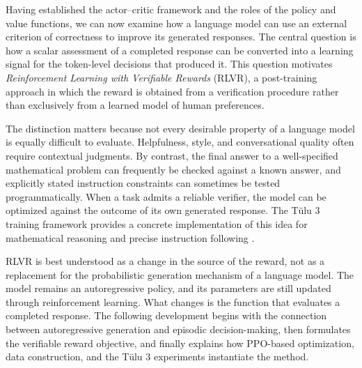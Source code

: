 %

Having established the actor--critic framework and the roles of the policy and
value functions, we can now examine how a language model can use an external
criterion of correctness to improve its generated responses. The central
question is how a scalar assessment of a completed response can be converted
into a learning signal for the token-level decisions that produced it. This
question motivates \emph{Reinforcement Learning with Verifiable Rewards}
(RLVR), a post-training approach in which the reward is obtained from a
verification procedure rather than exclusively from a learned model of human
preferences.

The distinction matters because not every desirable property of a language
model is equally difficult to evaluate. Helpfulness, style, and conversational
quality often require contextual judgments. By contrast, the final answer to a
well-specified mathematical problem can frequently be checked against a
known answer, and explicitly stated instruction constraints can sometimes be
tested programmatically. When a task admits a reliable verifier, the model can
be optimized against the outcome of its own generated response. The Tülu 3
training framework provides a concrete implementation of this idea for
mathematical reasoning and precise instruction following
\parencite{lambert2025tulu3}.

RLVR is best understood as a change in the source of the reward, not as a
replacement for the probabilistic generation mechanism of a language model.
The model remains an autoregressive policy, and its parameters are still
updated through reinforcement learning. What changes is the function that
evaluates a completed response. The following development begins with the
connection between autoregressive generation and episodic decision-making,
then formulates the verifiable reward objective, and finally explains how
PPO-based optimization, data construction, and the Tülu 3 experiments
instantiate the method.


